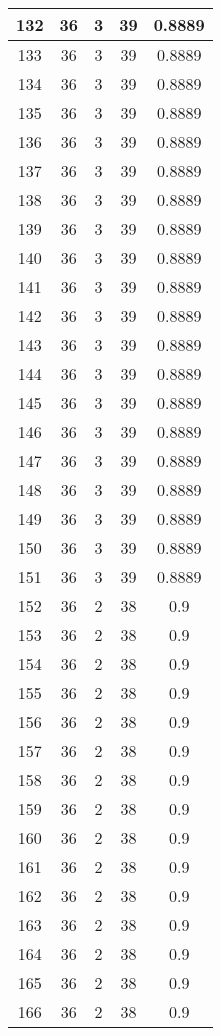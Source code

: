 \documentclass[letterpaper, 12pt]{article}
\begin{document}
\begin{longtable}{|c|c|c|c|c|}
\hline
132 & 36 & 3 & 39 & 0.8889 \\
\hline
133 & 36 & 3 & 39 & 0.8889 \\
\hline
134 & 36 & 3 & 39 & 0.8889 \\
\hline
135 & 36 & 3 & 39 & 0.8889 \\
\hline
136 & 36 & 3 & 39 & 0.8889 \\
\hline
137 & 36 & 3 & 39 & 0.8889 \\
\hline
138 & 36 & 3 & 39 & 0.8889 \\
\hline
139 & 36 & 3 & 39 & 0.8889 \\
\hline
140 & 36 & 3 & 39 & 0.8889 \\
\hline
141 & 36 & 3 & 39 & 0.8889 \\
\hline
142 & 36 & 3 & 39 & 0.8889 \\
\hline
143 & 36 & 3 & 39 & 0.8889 \\
\hline
144 & 36 & 3 & 39 & 0.8889 \\
\hline
145 & 36 & 3 & 39 & 0.8889 \\
\hline
146 & 36 & 3 & 39 & 0.8889 \\
\hline
147 & 36 & 3 & 39 & 0.8889 \\
\hline
148 & 36 & 3 & 39 & 0.8889 \\
\hline
149 & 36 & 3 & 39 & 0.8889 \\
\hline
150 & 36 & 3 & 39 & 0.8889 \\
\hline
151 & 36 & 3 & 39 & 0.8889 \\
\hline
152 & 36 & 2 & 38 & 0.9 \\
\hline
153 & 36 & 2 & 38 & 0.9 \\
\hline
154 & 36 & 2 & 38 & 0.9 \\
\hline
155 & 36 & 2 & 38 & 0.9 \\
\hline
156 & 36 & 2 & 38 & 0.9 \\
\hline
157 & 36 & 2 & 38 & 0.9 \\
\hline
158 & 36 & 2 & 38 & 0.9 \\
\hline
159 & 36 & 2 & 38 & 0.9 \\
\hline
160 & 36 & 2 & 38 & 0.9 \\
\hline
161 & 36 & 2 & 38 & 0.9 \\
\hline
162 & 36 & 2 & 38 & 0.9 \\
\hline
163 & 36 & 2 & 38 & 0.9 \\
\hline
164 & 36 & 2 & 38 & 0.9 \\
\hline
165 & 36 & 2 & 38 & 0.9 \\
\hline
166 & 36 & 2 & 38 & 0.9 \\

\end{longtable}
\end{document}
